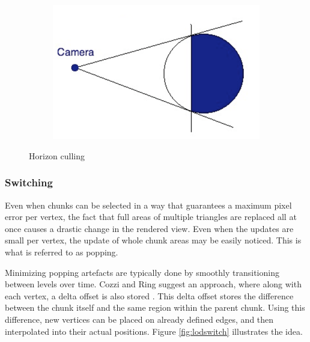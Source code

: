 \begin{figure}[htbp]
    \centering
    \begin{subfigure}[bt]{0.4\textwidth}
        \includegraphics[width=\textwidth]{figures/chunkedlod/horizonculling.png}
    \end{subfigure}
    \caption{Horizon culling}
    \label{fig:horizonculling}
\end{figure}


\subsubsection{Switching}
Even when chunks can be selected in a way that guarantees a maximum pixel error per vertex, the fact that full areas of multiple triangles are replaced all at once causes a drastic change in the rendered view. Even when the updates are small per vertex, the update of whole chunk areas may be easily noticed. This is what is referred to as popping.

Minimizing popping artefacts are typically done by smoothly transitioning between levels over time. Cozzi and Ring suggest an approach, where along with each vertex, a delta offset is also stored \cite[p. 451]{cozzi11}. This delta offset stores the difference between the chunk itself and the same region within the parent chunk. Using this difference, new vertices can be placed on already defined edges, and then interpolated into their actual positions. Figure \ref{fig:lodswitch} illustrates the idea.

